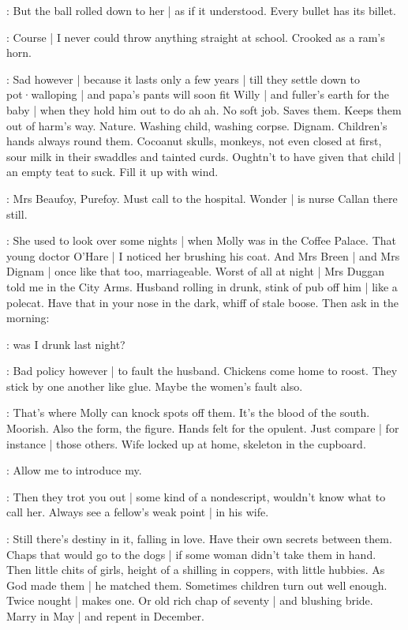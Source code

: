 \BloomCurrent:
But the ball rolled down to her |
as if it understood.
Every bullet has its billet.

\BloomHist:
Course |
I never could throw anything straight at school.
Crooked as a ram's horn.

\BloomAbstract:
Sad however |
because it lasts only a few years |
till they settle down to pot·walloping |
and papa's pants will soon fit Willy |
and fuller's earth for the baby |
when they hold him out to do ah ah.
No soft job.
Saves them.
Keeps them out of harm's way.
Nature.
Washing child,
washing corpse.
Dignam.
Children's hands always round them.
Cocoanut skulls,
monkeys,
not even closed at first,
sour milk in their swaddles and tainted curds.
Oughtn't to have given that child |
an empty teat to suck.
Fill it up with wind.

\BloomToday:
Mrs Beaufoy,
Purefoy.
Must call to the hospital.
Wonder |
is nurse Callan there still.%

\BloomHist:
She used to look over some nights |
when Molly was in the Coffee Palace.
That young doctor O'Hare |
I noticed her brushing his coat.
And Mrs Breen |
and Mrs Dignam |
once like that too,
marriageable.
Worst of all at night |
Mrs Duggan told me in the City Arms.
Husband rolling in drunk,
stink of pub off him |
like a polecat.
Have that in your nose in the dark,
whiff of stale boose.
Then ask in the morning:

\BloomOther:
was I drunk last night?

\BloomAbstract:
Bad policy however |
to fault the husband.
Chickens come home to roost.
They stick by one another like glue.
Maybe the women's fault also.

\BloomHist:
That's where Molly can knock spots off them.
It's the blood of the south.
Moorish.
Also the form,
the figure.
Hands felt for the opulent.
Just compare |
for instance |
those others.%
Wife locked up at home,
skeleton in the cupboard.

\BloomOther:
Allow me to introduce my.

\BloomHist:
Then they trot you out |
some kind of a nondescript,
wouldn't know what to call her.
Always see a fellow's weak point |
in his wife.

\BloomAbstract:
Still there's destiny in it,
falling in love.
Have their own secrets between them.
Chaps that would go to the dogs |
if some woman didn't take them in hand.
Then little chits of girls,
height of a shilling in coppers,
with little hubbies.
As God made them |
he matched them.
Sometimes children turn out well enough.
Twice nought | makes one.
Or old rich chap of seventy |
and blushing bride.
Marry in May |
and repent in December.

